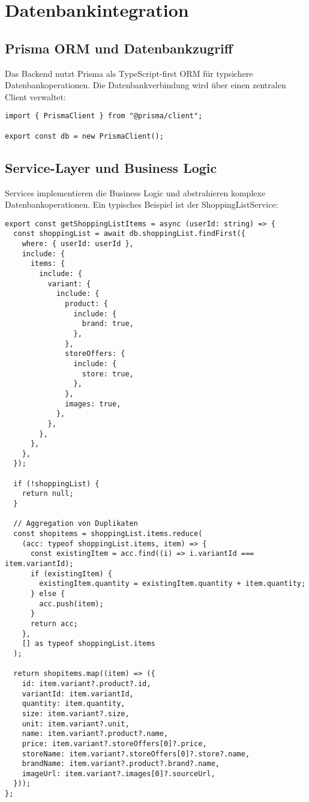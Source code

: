 \section{Datenbankintegration}

\subsection{Prisma ORM und Datenbankzugriff}

Das Backend nutzt Prisma als TypeScript-first ORM für typsichere Datenbankoperationen. Die Datenbankverbindung wird über einen zentralen Client verwaltet:

\begin{lstlisting}[style=typescriptstyle,caption={Datenbankverbindung}]
import { PrismaClient } from "@prisma/client";

export const db = new PrismaClient();
\end{lstlisting}

\subsection{Service-Layer und Business Logic}

Services implementieren die Business Logic und abstrahieren komplexe Datenbankoperationen. Ein typisches Beispiel ist der ShoppingListService:

\begin{lstlisting}[style=typescriptstyle,caption={Service-Layer Beispiel}]
export const getShoppingListItems = async (userId: string) => {
  const shoppingList = await db.shoppingList.findFirst({
    where: { userId: userId },
    include: {
      items: {
        include: {
          variant: {
            include: {
              product: {
                include: {
                  brand: true,
                },
              },
              storeOffers: {
                include: {
                  store: true,
                },
              },
              images: true,
            },
          },
        },
      },
    },
  });

  if (!shoppingList) {
    return null;
  }

  // Aggregation von Duplikaten
  const shopitems = shoppingList.items.reduce(
    (acc: typeof shoppingList.items, item) => {
      const existingItem = acc.find((i) => i.variantId === item.variantId);
      if (existingItem) {
        existingItem.quantity = existingItem.quantity + item.quantity;
      } else {
        acc.push(item);
      }
      return acc;
    },
    [] as typeof shoppingList.items
  );

  return shopitems.map((item) => ({
    id: item.variant?.product?.id,
    variantId: item.variantId,
    quantity: item.quantity,
    size: item.variant?.size,
    unit: item.variant?.unit,
    name: item.variant?.product?.name,
    price: item.variant?.storeOffers[0]?.price,
    storeName: item.variant?.storeOffers[0]?.store?.name,
    brandName: item.variant?.product?.brand?.name,
    imageUrl: item.variant?.images[0]?.sourceUrl,
  }));
};
\end{lstlisting}

